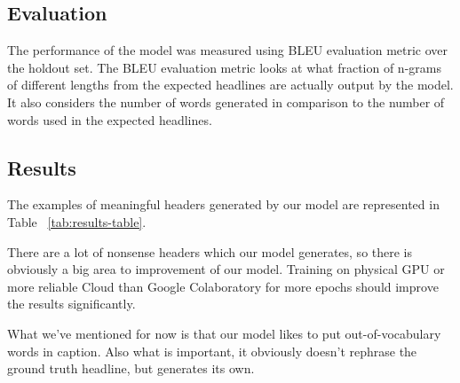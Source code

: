 \subsection{Evaluation}
The performance of the model was measured using BLEU \cite{bleu} evaluation metric over the holdout set. The BLEU evaluation metric looks at what fraction of n-grams of different lengths from the expected
headlines are actually output by the model. It also considers the number of words generated in comparison to the number of words used in the expected headlines. 


\subsection{Results}

The examples of meaningful headers generated by our model are represented in 
Table ~\ref{tab:results-table}.

There are a lot of nonsense headers which our model generates, so there is obviously a big area to improvement of our model. Training on physical GPU or more reliable Cloud than Google Colaboratory for more epochs should improve the results significantly. 

What we've mentioned for now is that our model likes to put out-of-vocabulary words in caption. Also what is important, it obviously doesn't rephrase the ground truth headline, but generates its own.

